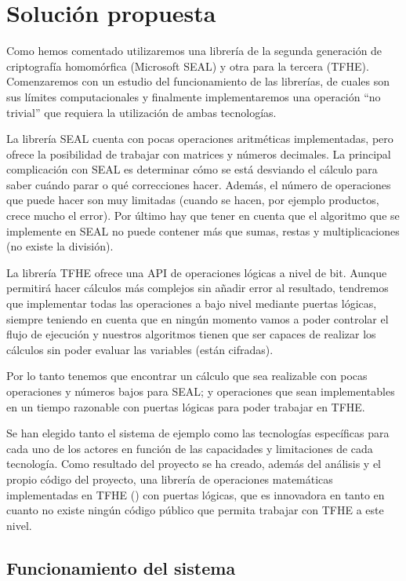 \chapter{Solución propuesta}
\label{chap:poc}

Como hemos comentado utilizaremos una librería de la segunda generación de criptografía homomórfica (Microsoft SEAL) y otra para la tercera (TFHE). Comenzaremos con un estudio del funcionamiento de las librerías, de cuales son sus límites computacionales y finalmente implementaremos una operación ``no trivial'' que requiera la utilización de ambas tecnologías.

La librería SEAL cuenta con pocas operaciones aritméticas implementadas, pero ofrece la posibilidad de trabajar con matrices y números decimales. La principal complicación con SEAL es determinar cómo se está desviando el cálculo para saber cuándo parar o qué correcciones hacer. Además, el número de operaciones que puede hacer son muy limitadas (cuando se hacen, por ejemplo productos, crece mucho el error). Por último hay que tener en cuenta que el algoritmo que se implemente en SEAL no puede contener más que sumas, restas y multiplicaciones (no existe la división).

La librería TFHE ofrece una API de operaciones lógicas a nivel de bit. Aunque permitirá hacer cálculos más complejos sin añadir error al resultado, tendremos que implementar todas las operaciones a bajo nivel mediante puertas lógicas, siempre teniendo en cuenta que en ningún momento vamos a poder controlar el flujo de ejecución y nuestros algoritmos tienen que ser capaces de realizar los cálculos sin poder evaluar las variables (están cifradas).

Por lo tanto tenemos que encontrar un cálculo que sea realizable con pocas operaciones y números bajos para SEAL; y operaciones que sean implementables en un tiempo razonable con puertas lógicas para poder trabajar en TFHE.

Se han elegido tanto el sistema de ejemplo como las tecnologías específicas para cada uno de los actores en función de las capacidades y limitaciones de cada tecnología. Como resultado del proyecto se ha creado, además del análisis y el propio código del proyecto, una librería de operaciones matemáticas implementadas en TFHE (\cite{junquera_tfhe_2019}) con puertas lógicas, que es innovadora en tanto en cuanto no existe ningún código público que permita trabajar con TFHE a este nivel.

\section{Funcionamiento del sistema}

